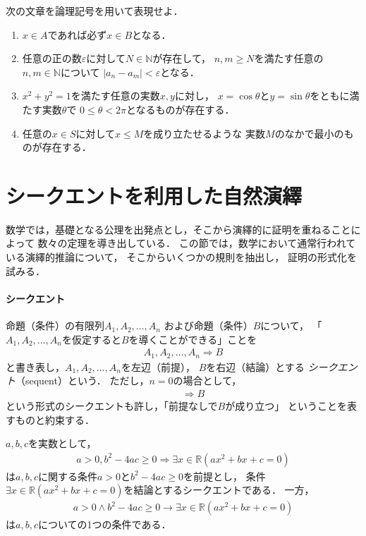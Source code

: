  \begin{que} \label{que:nihongokarakigou}
   次の文章を論理記号を用いて表現せよ．
   \begin{enumerate}
     \item $x \in A$であれば必ず$x \in B$となる．
     \item 任意の正の数$\varepsilon$に対して$N \in \mathbb{N}$が存在して，
       $n, m \geq N$を満たす任意の$n,m \in \mathbb{N}$について
       $\lvert a_n - a_m \rvert < \varepsilon$となる．
     \item $x^2+y^2=1$を満たす任意の実数$x,y$に対し，
       $x= \cos \theta $と$ y= \sin \theta$をともに満たす実数$\theta$で
       $0 \leq \theta < 2 \pi$となるものが存在する．
     \item 任意の$x \in S$に対して$x \leq M$を成り立たせるような
       実数$M$のなかで最小のものが存在する． 
   \end{enumerate}
 \end{que}

 \section{シークエントを利用した自然演繹}
 \label{sec:sequent}
 数学では，基礎となる公理を出発点とし，そこから演繹的に証明を重ねることによって
 数々の定理を導き出している．
 この節では，数学において通常行われている演繹的推論について，
 そこからいくつかの規則を抽出し，
 証明の形式化を試みる．

 \paragraph{シークエント}
 命題（条件）の有限列$A_1, A_2, \ldots , A_n$
 および命題（条件）$B$について，
 「$A_1, A_2, \ldots , A_n$を仮定すると$B$を導くことができる」ことを
 \begin{align}
   A_1 , A_2, \ldots , A_n \Longrightarrow B
   \label{eq:sequent}
 \end{align}
 と書き表し，$A_1, A_2 , \ldots ,A_n $を左辺（前提），
 $B$を右辺（結論）とする
 \emph{シークエント}（sequent）という．
 ただし，$n=0$の場合として，
 \begin{align}
   \qquad \Longrightarrow B
   \label{eq:sequentempty}
 \end{align}
 という形式のシークエントも許し，「前提なしで$B$が成り立つ」
 ということを表すものと約束する．

 \begin{ex}
   $a,  b,  c$を実数として，
   \begin{align*}
    a>0 , b^2-4ac \geq 0 \Longrightarrow 
    \exists x \in \mathbb{R} ( ax^2 +bx+c=0)
   \end{align*}  
   は$a,  b,  c$に関する条件$a>0$と$b^2 - 4ac \geq 0$を前提とし，
   条件$\exists x \in \mathbb{R} ( ax^2+bx+c=0)
   $を結論とするシークエントである．
   一方，
   \begin{align*}
     a>0 \land b^2 -4ac \geq 0 \to
     \exists x \in \mathbb{R} ( ax^2 +bx +c =0)
   \end{align*}
   は$a,  b,  c$についての1つの条件である．
 \end{ex}


